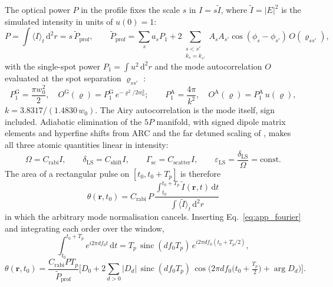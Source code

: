 The optical power $P$ in the profile fixes the scale $s$ in
$I=s\tilde I$, where $\tilde I=|E|^2$ is the simulated intensity in units of
$u(0)=1$:
\begin{equation}
P=\int\langle I\rangle_t\,\mathrm{d}^2r=s\,\tilde P_\mathrm{prof},
\qquad
\tilde P_\mathrm{prof}=\sum_s a_sP_1
+2\!\!\sum_{\substack{s<s'\\ k_s=k_{s'}}}\!\!A_sA_{s'}
\cos(\phi_s-\phi_{s'})\,O(\varrho_{ss'}),
\label{eq:app_scale}
\end{equation}
with the single-spot power $P_1=\int u^2\,\mathrm{d}^2r$ and the mode
autocorrelation $O$ evaluated at the spot separation $\varrho_{ss'}$
\cite{Goodman2017,BornWolf1999,DLMF}:
\begin{equation}
P_1^\mathrm{G}=\frac{\pi w_0^2}{2},
\quad
O^\mathrm{G}(\varrho)=P_1^\mathrm{G}\,e^{-\varrho^2/2w_0^2};
\qquad
P_1^\mathrm{A}=\frac{4\pi}{k^2},
\quad
O^\mathrm{A}(\varrho)=P_1^\mathrm{A}\,u(\varrho),
\label{eq:app_overlap}
\end{equation}
$k=3.8317/(1.4830\,w_0)$. The Airy autocorrelation is the mode itself, sign
included. Adiabatic elimination of the $5P$ manifold, with signed dipole
matrix elements and hyperfine shifts from ARC \cite{ARC2017,SteckRb85} and the
far detuned scaling of \cite{Grimm2000}, makes all three atomic quantities
linear in intensity:
\begin{equation}
\Omega=C_\mathrm{rabi}I,
\qquad
\delta_\mathrm{LS}=C_\mathrm{shift}I,
\qquad
\Gamma_\mathrm{sc}=C_\mathrm{scatter}I,
\qquad
\varepsilon_\mathrm{LS}=\frac{\delta_\mathrm{LS}}{\Omega}=\text{const} .
\end{equation}
The area of a rectangular pulse on $[t_0,t_0+T_p]$ is therefore
\begin{equation}
\boxed{\;
\theta(\mathbf{r},t_0)=C_\mathrm{rabi}\,P\,
\frac{\displaystyle\int_{t_0}^{t_0+T_p}\tilde I(\mathbf{r},t)\,\mathrm{d}t}
     {\displaystyle\int\langle\tilde I\rangle_t\,\mathrm{d}^2r}\;}
\label{eq:app_area}
\end{equation}
in which the arbitrary mode normalisation cancels. Inserting
Eq.~\eqref{eq:app_fourier} and integrating each order over the window,
\begin{equation}
\int_{t_0}^{t_0+T_p}\!\!e^{i2\pi df_0t}\,\mathrm{d}t
=T_p\,\operatorname{sinc}(d f_0T_p)\,e^{i2\pi df_0(t_0+T_p/2)},
\label{eq:app_sinc}
\end{equation}
\begin{equation}
\theta(\mathbf{r},t_0)=\frac{C_\mathrm{rabi}PT_p}{\tilde P_\mathrm{prof}}
\bigg[D_0+2\sum_{d>0}|D_d|\,\operatorname{sinc}(df_0T_p)\,
\cos\!\Big(2\pi df_0\big(t_0+\tfrac{T_p}{2}\big)+\arg D_d\Big)\bigg].
\label{eq:app_areaclosed}
\end{equation}

